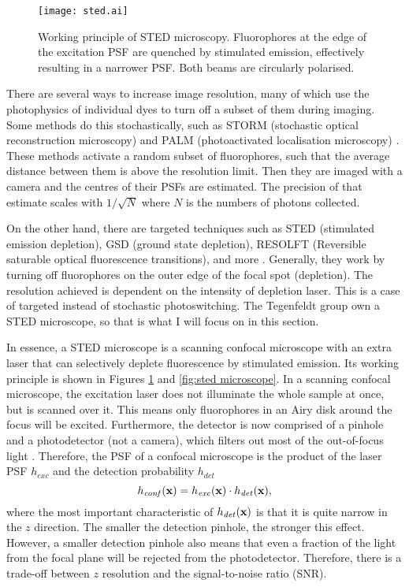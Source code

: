 \begin{figure}
	\centering
	\texttt{[image: sted.ai]}
	\caption{
		Working principle of STED microscopy. Fluorophores at the edge of the excitation PSF are quenched by stimulated emission, effectively resulting in a narrower PSF. Both beams are circularly polarised. 
	}
	\label{fig:sted principle}
\end{figure}

There are several ways to increase image resolution, many of which use the photophysics of individual dyes to turn off a subset of them during imaging. Some methods do this stochastically, such as STORM (stochastic optical reconstruction microscopy) and PALM (photoactivated localisation microscopy) \cite{Mock2009, Betzig2006}. These methods activate a random subset of fluorophores, such that the average distance between them is above the resolution limit. Then they are imaged with a camera and the centres of their PSFs are estimated. The precision of that estimate scales with $ 1/\sqrt{N} $ where $ N $ is the numbers of photons collected.

On the other hand, there are targeted techniques such as STED (stimulated emission depletion), GSD (ground state depletion), RESOLFT (Reversible saturable optical fluorescence transitions), and more \cite{Klar2000, Folling2008, Hofmann2005}. Generally, they work by turning off fluorophores on the outer edge of the focal spot (depletion). The resolution achieved is dependent on the intensity of depletion laser. This is a case of targeted instead of stochastic photoswitching. The Tegenfeldt group own a STED microscope, so that is what I will focus on in this section. 

In essence, a STED microscope is a scanning confocal microscope with an extra laser that can selectively deplete fluorescence by stimulated emission. Its working principle is shown in Figures \ref{fig:sted principle} and \ref{fig:sted microscope}. In a scanning confocal microscope, the excitation laser does not illuminate the whole sample at once, but is scanned over it. This means only fluorophores in an Airy disk around the focus will be excited. Furthermore, the detector is now comprised of a pinhole and a photodetector (not a camera), which filters out most of the out-of-focus light \cite{Minsky1957}. Therefore, the PSF of a confocal microscope is the product of the laser PSF $ h_\mathit{exc} $ and the detection probability $ h_\mathit{det} $
\begin{equation}
	h_\mathit{conf}(\vb{x}) = h_\mathit{exc}(\vb{x}) \cdot h_\mathit{det}(\vb{x}),
\end{equation}
where the most important characteristic of $ h_\mathit{det}(\vb{x}) $ is that it is quite narrow in the $ z $ direction. The smaller the detection pinhole, the stronger this effect. However, a smaller detection pinhole also means that even a fraction of the light from the focal plane will be rejected from the photodetector. Therefore, there is a trade-off between $ z $ resolution and the signal-to-noise ratio (SNR).

